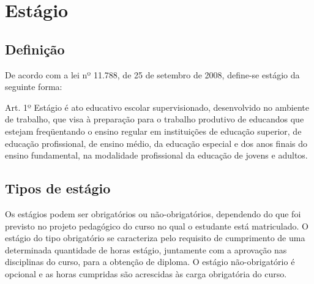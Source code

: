 \section{Estágio}

\subsection{Definição}
De acordo com a lei nº 11.788, de 25 de setembro de 2008, define-se estágio da seguinte forma:
\begin{quoting}[rightmargin=0cm,leftmargin=4cm]
	\begin{SingleSpace}
	{\footnotesize
	Art. 1º  Estágio é ato educativo escolar supervisionado, desenvolvido no ambiente de trabalho, que visa à preparação para o trabalho produtivo de educandos que estejam freqüentando o ensino regular em instituições de educação superior, de educação profissional, de ensino médio, da educação especial e dos anos finais do ensino fundamental, na modalidade profissional da educação de jovens e adultos. \cite{leiestagio}
	}
	\end{SingleSpace}
\end{quoting}

\subsection{Tipos de estágio}
Os estágios podem ser obrigatórios ou não-obrigatórios, dependendo do que foi previsto no projeto pedagógico do curso no qual o estudante está matriculado. O estágio do tipo obrigatório se caracteriza pelo requisito de cumprimento de uma determinada quantidade de horas estágio, juntamente com a aprovação nas disciplinas do curso, para a obtenção de diploma. O estágio não-obrigatório é opcional e as horas cumpridas são acrescidas às carga obrigatória do curso. \cite{leiestagio}

